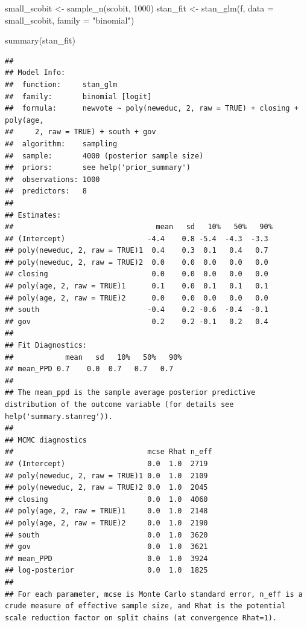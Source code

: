 \documentclass[
]{book}
\newenvironment{Shaded}{\begin{snugshade}}{\end{snugshade}}
\newcommand{\AttributeTok}[1]{\textcolor[rgb]{0.77,0.63,0.00}{#1}}
\newcommand{\DecValTok}[1]{\textcolor[rgb]{0.00,0.00,0.81}{#1}}
\newcommand{\FunctionTok}[1]{\textcolor[rgb]{0.00,0.00,0.00}{#1}}
\newcommand{\NormalTok}[1]{#1}
\newcommand{\OtherTok}[1]{\textcolor[rgb]{0.56,0.35,0.01}{#1}}
\newcommand{\StringTok}[1]{\textcolor[rgb]{0.31,0.60,0.02}{#1}}
\begin{document}
\begin{Shaded}
\begin{Highlighting}[]
\NormalTok{small\_scobit }\OtherTok{\textless{}{-}} \FunctionTok{sample\_n}\NormalTok{(scobit, }\DecValTok{1000}\NormalTok{)}
\NormalTok{stan\_fit }\OtherTok{\textless{}{-}} \FunctionTok{stan\_glm}\NormalTok{(f, }\AttributeTok{data =}\NormalTok{ small\_scobit, }\AttributeTok{family =} \StringTok{"binomial"}\NormalTok{)}
\end{Highlighting}
\end{Shaded}

\begin{Shaded}
\begin{Highlighting}[]
\FunctionTok{summary}\NormalTok{(stan\_fit)}
\end{Highlighting}
\end{Shaded}

\begin{verbatim}
## 
## Model Info:
##  function:     stan_glm
##  family:       binomial [logit]
##  formula:      newvote ~ poly(neweduc, 2, raw = TRUE) + closing + poly(age, 
##     2, raw = TRUE) + south + gov
##  algorithm:    sampling
##  sample:       4000 (posterior sample size)
##  priors:       see help('prior_summary')
##  observations: 1000
##  predictors:   8
## 
## Estimates:
##                                 mean   sd   10%   50%   90%
## (Intercept)                   -4.4    0.8 -5.4  -4.3  -3.3 
## poly(neweduc, 2, raw = TRUE)1  0.4    0.3  0.1   0.4   0.7 
## poly(neweduc, 2, raw = TRUE)2  0.0    0.0  0.0   0.0   0.0 
## closing                        0.0    0.0  0.0   0.0   0.0 
## poly(age, 2, raw = TRUE)1      0.1    0.0  0.1   0.1   0.1 
## poly(age, 2, raw = TRUE)2      0.0    0.0  0.0   0.0   0.0 
## south                         -0.4    0.2 -0.6  -0.4  -0.1 
## gov                            0.2    0.2 -0.1   0.2   0.4 
## 
## Fit Diagnostics:
##            mean   sd   10%   50%   90%
## mean_PPD 0.7    0.0  0.7   0.7   0.7  
## 
## The mean_ppd is the sample average posterior predictive distribution of the outcome variable (for details see help('summary.stanreg')).
## 
## MCMC diagnostics
##                               mcse Rhat n_eff
## (Intercept)                   0.0  1.0  2719 
## poly(neweduc, 2, raw = TRUE)1 0.0  1.0  2109 
## poly(neweduc, 2, raw = TRUE)2 0.0  1.0  2045 
## closing                       0.0  1.0  4060 
## poly(age, 2, raw = TRUE)1     0.0  1.0  2148 
## poly(age, 2, raw = TRUE)2     0.0  1.0  2190 
## south                         0.0  1.0  3620 
## gov                           0.0  1.0  3621 
## mean_PPD                      0.0  1.0  3924 
## log-posterior                 0.0  1.0  1825 
## 
## For each parameter, mcse is Monte Carlo standard error, n_eff is a crude measure of effective sample size, and Rhat is the potential scale reduction factor on split chains (at convergence Rhat=1).
\end{verbatim}
\end{document}
